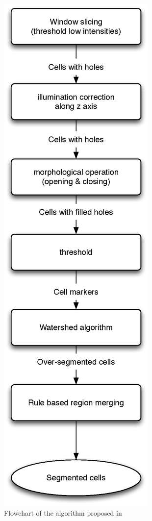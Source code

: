 \begin{figure}[h]
\begin{center}
\leavevmode
\includegraphics[height=0.75\textheight]{pictures/watershedFlowchart}
\end{center}
\caption{Flowchart of the algorithm proposed in~\cite{umesh2001efficient}}
\label{fig:watershedFlowchart}
\end{figure}
